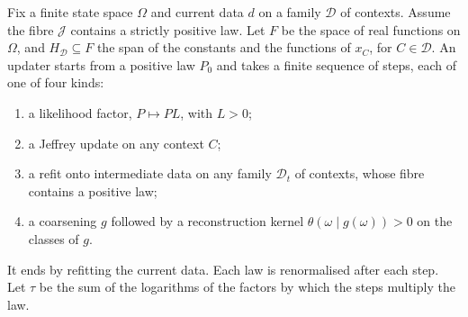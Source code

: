 \documentclass[11pt]{article}
\theoremstyle{definition}\newtheorem{definition}[theorem]{Definition}\newtheorem{remark}[theorem]{Remark}\newtheorem{example}[theorem]{Example}\newtheorem{problem}[theorem]{Open problem}\crefname{problem}{Problem}{Problems}
\begin{document}
Fix a finite state space $\Omega$ and current data $d$ on a family $\mathcal D$ of contexts. Assume the fibre $\mathcal J$ contains a strictly positive law. Let $F$ be the space of real functions on $\Omega$, and $H_{\mathcal D}\subseteq F$ the span of the constants and the functions of $x_C$, for $C\in\mathcal D$. An updater starts from a positive law $P_0$ and takes a finite sequence of steps, each of one of four kinds:
\begin{enumerate}
\item[(a)] a likelihood factor, $P\mapsto PL$, with $L>0$;
\item[(b)] a Jeffrey update on any context $C$;
\item[(c)] a refit onto intermediate data on any family $\mathcal D_t$ of contexts, whose fibre contains a positive law;
\item[(d)] a coarsening $g$ followed by a reconstruction kernel $\theta(\omega\mid g(\omega))>0$ on the classes of $g$.
\end{enumerate}
It ends by refitting the current data. Each law is renormalised after each step. Let $\tau$ be the sum of the logarithms of the factors by which the steps multiply the law.
\end{document}
